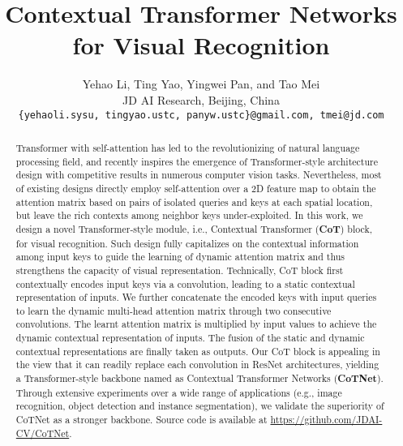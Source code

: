 \documentclass[10pt,twocolumn,letterpaper]{article}
\begin{document}
\title{Contextual Transformer Networks for Visual Recognition}

\author{Yehao Li, Ting Yao, Yingwei Pan, and Tao Mei \\
{\normalsize\centering JD AI Research, Beijing, China}\\
{\tt\small \{yehaoli.sysu, tingyao.ustc, panyw.ustc\}@gmail.com, tmei@jd.com}
}

\maketitle
\ificcvfinal\thispagestyle{empty}\fi

\begin{abstract}
   Transformer with self-attention has led to the revolutionizing of natural language processing field, and recently inspires the emergence of Transformer-style architecture design with competitive results in numerous computer vision tasks. Nevertheless, most of existing designs directly employ self-attention over a 2D feature map to obtain the attention matrix based on pairs of isolated queries and keys at each spatial location, but leave the rich contexts among neighbor keys under-exploited. In this work, we design a novel Transformer-style module, i.e., Contextual Transformer (\textbf{CoT}) block, for visual recognition. Such design fully capitalizes on the contextual information among input keys to guide the learning of dynamic attention matrix and thus strengthens the capacity of visual representation. Technically, CoT block first contextually encodes input keys via a  convolution, leading to a static contextual representation of inputs. We further concatenate the encoded keys with input queries to learn the dynamic multi-head attention matrix through two consecutive  convolutions. The learnt attention matrix is multiplied by input values to achieve the dynamic contextual representation of inputs. The fusion of the static and dynamic contextual representations are finally taken as outputs. Our CoT block is appealing in the view that it can readily replace each  convolution in ResNet architectures, yielding a Transformer-style backbone named as Contextual Transformer Networks (\textbf{CoTNet}). Through extensive experiments over a wide range of applications (e.g., image recognition, object detection and instance segmentation), we validate the superiority of CoTNet as a stronger backbone.
   Source code is available at \url{https://github.com/JDAI-CV/CoTNet}.
\end{abstract}
\end{document}

